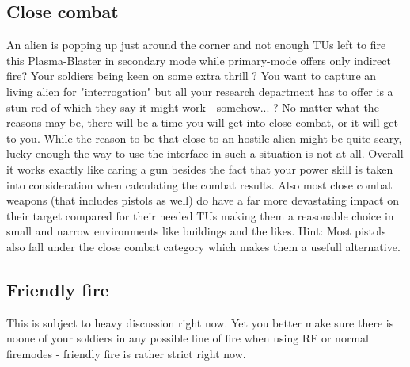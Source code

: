 \subsection{Close combat}
An alien is popping up just around the corner and not enough TUs left to fire this Plasma-Blaster in secondary mode while primary-mode offers only indirect fire? Your soldiers being keen on some extra thrill ? You want to capture an living alien for "interrogation"   but all your research department has to offer is a stun rod of which they say it might work - somehow... ? No matter what the reasons may be, there will be a time you will get into close-combat, or it will get to you. While the reason to be that close to an hostile alien might be quite scary, lucky enough the way to use the interface in such a situation is not at all. Overall it works exactly like caring a gun besides the fact that your power skill is taken into consideration when calculating the combat results. Also most close combat weapons (that includes pistols as well) do have a far more devastating impact on their target compared for their needed TUs making them a reasonable choice in small and narrow environments like buildings and the likes. Hint: Most pistols also fall under the close combat category which makes them a usefull alternative.

\subsection{Friendly fire}
This is subject to heavy discussion right now. Yet you better make sure there is noone of your soldiers in any possible line of fire when using RF or normal firemodes - friendly fire is rather strict right now.

